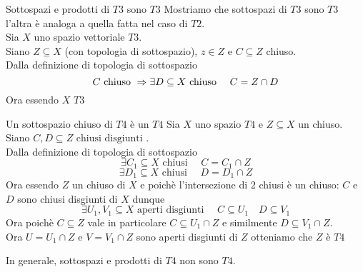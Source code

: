 \begin{prop} Sottospazi e prodotti di $T3$ sono $T3$
\proof  Mostriamo che sottospazi di $T3$ sono $T3$ l'altra \`e analoga a quella fatta nel caso di $T2$.\\
Sia $X$ uno spazio vettoriale $T3$.\\
Siano $Z\subseteq X $ (con topologia di sottospazio),  $z\in Z$ e $C\subseteq Z $ chiuso.\\
Dalla definizione di topologia di sottospazio
$$ C\text{ chiuso } \Rightarrow \exists D \subseteq X \text{ chiuso } \quad C = Z\cap D $$
Ora essendo $X$ $T3$ 
\end{prop}
\spazio
\begin{prop}Un sottospazio chiuso di $T4$ \`e un $T4$
\proof Sia $X$ uno spazio $T4$ e $Z\subseteq X $ un chiuso.\\
Siano $C,D\subseteq Z \text{ chiusi disgiunti }$.\\
Dalla definizione di topologia di sottospazio
$$ \exists C_1 \subseteq X \text{ chiusi } \quad C= C_1\cap Z $$
$$ \exists D_1 \subseteq X \text{ chiusi } \quad D= D_1\cap Z $$
Ora essendo $Z$ un chiuso di $X$ e poich\`e l'intersezione di $2$ chiusi \`e un chiuso: $C$ e $D$ sono chiusi disgiunti di $X$ dunque 
$$ \exists U_1,V_1\subseteq X \text{ aperti disgiunti } \quad C\subseteq U_1 \quad D \subseteq V_1$$ 
Ora poich\`e $C\subseteq Z$ vale in particolare $C\subseteq U_1 \cap Z$ e similmente $D\subseteq V_1\cap Z$.\\
Ora $U=U_1\cap Z $ e $V=V_1\cap Z$ sono aperti disgiunti di $Z$ otteniamo che $Z$ \`e $T4$
\endproof

\end{prop}
\begin{oss}In generale,  sottospazi e prodotti di $T4$ non sono $T4$.\\
\end{oss}
\newpage


